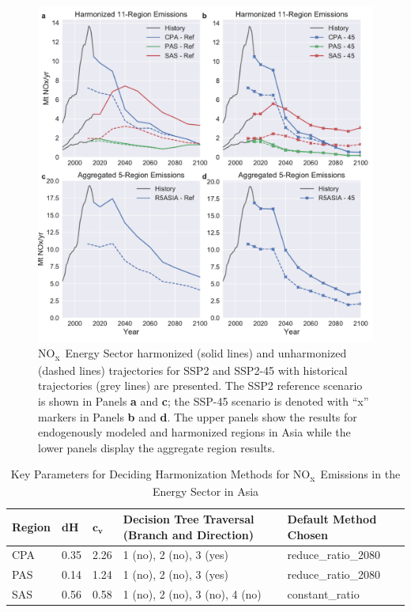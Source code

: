 \documentclass[review]{elsarticle}
\newcommand{\noxx}{NO\textsubscript{x}~}
\begin{document}
\begin{figure}
  \begin{center}
    \includegraphics[width=\textwidth]{example_NOx_Energy_Sector.pdf}
    \caption[]{
      \label{fig:nox}
      \noxx Energy Sector harmonized (solid lines) and unharmonized (dashed lines)
      trajectories for SSP2 and SSP2-45 with historical trajectories (grey
      lines) are presented. The SSP2 reference scenario is shown in Panels
      \textbf{a} and \textbf{c}; the SSP-45 scenario is denoted with ``x''
      markers in Panels \textbf{b} and \textbf{d}. The upper panels show the
      results for endogenously modeled and harmonized regions in Asia while the
      lower panels display the aggregate region results.  
    }
  \end{center}
\end{figure}

\begin{table}[]
\centering
\caption{Key Parameters for Deciding Harmonization Methods for \noxx Emissions in the Energy Sector in Asia}
\label{tab:nox}
\begin{tabular}{|p{1.2cm}|p{.5cm}|p{.5cm}|p{4.5cm}|p{3cm}|}
\hline
\textbf{Region} & \textbf{dH} & $\mathbf{c_v}$ & \textbf{Decision Tree Traversal (Branch and Direction)} & \textbf{Default Method Chosen} \\ \hline
    \hline
CPA             & 0.35        & 2.26          & 1 (no), 2 (no), 3 (yes)                                 & reduce\_ratio\_2080    \\ \hline
PAS             & 0.14        & 1.24          & 1 (no), 2 (no), 3 (yes)                                 & reduce\_ratio\_2080    \\ \hline
SAS             & 0.56        & 0.58          & 1 (no), 2 (no), 3 (no), 4 (no)                          & constant\_ratio        \\ \hline
\end{tabular}
\end{table}
\end{document}
